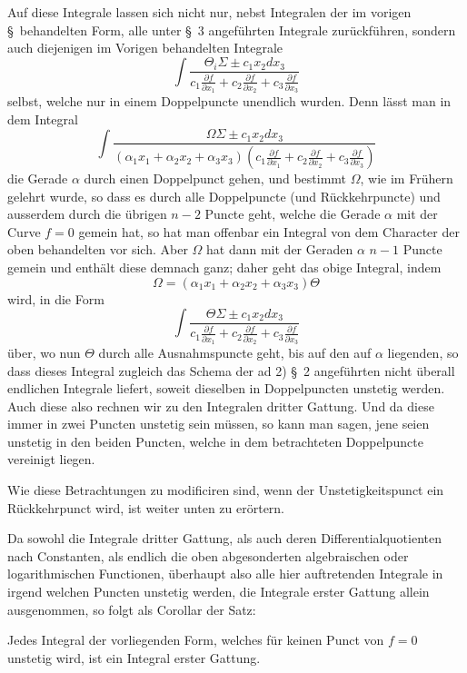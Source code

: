 \documentclass[10pt]{article}
\begin{document}
Auf diese Integrale lassen sich nicht nur, nebst Integralen der im vorigen \S\ behandelten Form, alle unter \S\ 3 angeführten Integrale zurückführen, sondern auch diejenigen im Vorigen behandelten Integrale
\[
\int\frac{\Theta_i\Sigma\pm c_1x_2dx_3}{c_1\frac{\partial f}{\partial x_1}+c_2\frac{\partial f}{\partial x_2}+c_3\frac{\partial f}{\partial x_3}}
\]
selbst, welche nur in einem Doppelpuncte unendlich wurden. Denn lässt man in dem Integral
\[
\int\frac{\Omega\Sigma\pm c_1x_2dx_3}{(\alpha_1x_1+\alpha_2x_2+\alpha_3x_3)\left(c_1\frac{\partial f}{\partial x_1}+c_2\frac{\partial f}{\partial x_2}+c_3\frac{\partial f}{\partial x_3}\right)}
\]
die Gerade $\alpha$ durch einen Doppelpunct gehen, und bestimmt $\Omega$, wie im Frühern gelehrt wurde, so dass es durch alle Doppelpuncte (und Rückkehrpuncte) und ausserdem durch die übrigen $n-2$ Puncte geht, welche die Gerade $\alpha$ mit der Curve $f=0$ gemein hat, so hat man offenbar ein Integral von dem Character der oben behandelten vor sich. Aber $\Omega$ hat dann mit der Geraden $\alpha$ $n-1$ Puncte gemein und enthält diese demnach ganz; daher geht das obige Integral, indem
\[
\Omega=(\alpha_1x_1+\alpha_2x_2+\alpha_3x_3)\Theta
\]
wird, in die Form
\[
\int\frac{\Theta\Sigma\pm c_1x_2dx_3}{c_1\frac{\partial f}{\partial x_1}+c_2\frac{\partial f}{\partial x_2}+c_3\frac{\partial f}{\partial x_3}}
\]
über, wo nun $\Theta$ durch alle Ausnahmspuncte geht, bis auf den auf $\alpha$ liegenden, so dass dieses Integral zugleich das Schema der ad 2) \S\ 2 angeführten nicht überall endlichen Integrale liefert, soweit dieselben in Doppelpuncten unstetig werden. Auch diese also rechnen wir zu den Integralen dritter Gattung. Und da diese immer in zwei Puncten unstetig sein müssen, so kann man sagen, jene seien unstetig in den beiden Puncten, welche in dem betrachteten Doppelpuncte vereinigt liegen.

Wie diese Betrachtungen zu modificiren sind, wenn der Unstetigkeitspunct ein Rückkehrpunct wird, ist weiter unten zu erörtern.

Da sowohl die Integrale dritter Gattung, als auch deren Differentialquotienten nach Constanten, als endlich die oben abgesonderten algebraischen oder logarithmischen Functionen, überhaupt also alle hier auftretenden Integrale in irgend welchen Puncten unstetig werden, die Integrale erster Gattung allein ausgenommen, so folgt als Corollar der Satz:

Jedes Integral der vorliegenden Form, welches für keinen Punct von $f=0$ unstetig wird, ist ein Integral erster Gattung.
\end{document}

